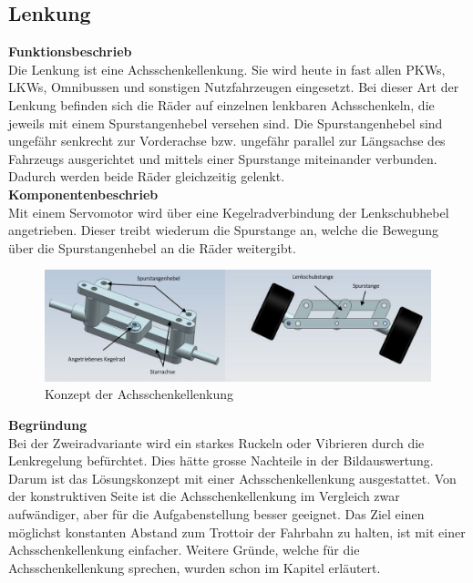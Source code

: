 \subsection{Lenkung}

\textbf{Funktionsbeschrieb}
\\[0.2cm]
Die Lenkung ist eine Achsschenkellenkung. Sie wird heute in fast allen PKWs, LKWs, Omnibussen und sonstigen Nutzfahrzeugen eingesetzt. Bei dieser Art der Lenkung befinden sich die Räder auf einzelnen lenkbaren Achsschenkeln, die jeweils mit einem Spurstangenhebel versehen sind. Die Spurstangenhebel sind ungefähr senkrecht zur Vorderachse bzw. ungefähr parallel zur Längsachse des Fahrzeugs ausgerichtet und mittels einer Spurstange miteinander verbunden. Dadurch werden beide Räder gleichzeitig gelenkt.\\[0.2cm]
\textbf{Komponentenbeschrieb}
\\[0.2cm]
Mit einem Servomotor wird über eine Kegelradverbindung der Lenkschubhebel angetrieben. Dieser treibt wiederum die Spurstange an, welche die Bewegung über die Spurstangenhebel an die Räder weitergibt.
\begin{figure}[H]%
\centering
\includegraphics[width=1\textwidth]{03_Loesungskonzept/pictures/Achsschenkellenkung.png}
\caption{Konzept der Achsschenkellenkung}
\label{fig:activityRoute}
\end{figure}\flushleft
\textbf{Begründung}\\[0.2cm]
Bei der Zweiradvariante wird ein starkes Ruckeln oder Vibrieren durch die Lenkregelung befürchtet. Dies hätte grosse Nachteile in der Bildauswertung. Darum ist das Lösungskonzept mit einer Achsschenkellenkung ausgestattet. Von der konstruktiven Seite ist die Achsschenkellenkung im Vergleich zwar aufwändiger, aber für die Aufgabenstellung besser geeignet. Das Ziel einen möglichst konstanten Abstand zum Trottoir der Fahrbahn zu halten, ist mit einer Achsschenkellenkung einfacher. Weitere Gründe, welche für die Achsschenkellenkung sprechen, wurden schon im Kapitel \grqq  erläutert.
